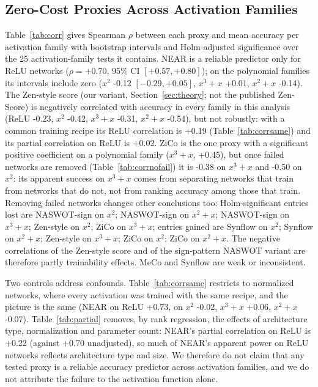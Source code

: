 

\subsection{Zero-Cost Proxies Across Activation Families}

Table~\ref{tab:corr} gives Spearman $\rho$ between each proxy and mean accuracy per activation family with bootstrap intervals and Holm-adjusted
significance over the 25 activation-family tests it contains.  NEAR is a reliable predictor only for ReLU networks
($\rho=+0.70$, $95\%$ CI $[+0.57,+0.80]$); on the polynomial families its intervals include zero
($x^2$ -0.12 $[-0.29,+0.05]$, $x^3{+}x$ +0.01, $x^2{+}x$ -0.14).  The Zen-style score (our variant, Section~\ref{sec:theory}; not the published Zen-Score) is negatively correlated with accuracy in every family in this analysis
(ReLU -0.23, $x^2$ -0.42, $x^3{+}x$ -0.31, $x^2{+}x$ -0.54), but not robustly: with a common training recipe its ReLU correlation is +0.19 (Table~\ref{tab:corrsame}) and its partial correlation on ReLU is +0.02.  ZiCo is the one proxy with a significant positive coefficient on a polynomial family
($x^3{+}x$, +0.45), but once failed networks are removed (Table~\ref{tab:corrnofail}) it is -0.38 on $x^3{+}x$ and -0.50 on $x^2$:
its apparent success on $x^3{+}x$ comes from separating networks that train from networks that do not, not from ranking accuracy among those that train.
Removing failed networks changes other conclusions too: Holm-significant entries lost are NASWOT-sign on $x^2$; NASWOT-sign on $x^2{+}x$; NASWOT-sign on $x^3{+}x$; Zen-style on $x^2$; ZiCo on $x^3{+}x$; entries gained are Synflow on $x^2$; Synflow on $x^2{+}x$; Zen-style on $x^3{+}x$; ZiCo on $x^2$; ZiCo on $x^2{+}x$.  The negative correlations of the Zen-style score and of the sign-pattern NASWOT variant are therefore partly trainability effects.
MeCo and Synflow are weak or inconsistent.

Two controls address confounds.  Table~\ref{tab:corrsame} restricts to normalized networks, where every activation was trained with the same recipe, and the picture is the same
(NEAR on ReLU +0.73, on $x^2$ -0.02, $x^3{+}x$ +0.06, $x^2{+}x$ -0.07).  Table~\ref{tab:partial} removes, by rank regression, the effects of architecture type, normalization and
parameter count: NEAR's partial correlation on ReLU is +0.22 (against +0.70 unadjusted), so much of NEAR's apparent power on ReLU networks reflects architecture type and
size.  We therefore do not claim that any tested proxy is a reliable accuracy predictor across activation families, and we do not attribute the failure to the activation function alone.

